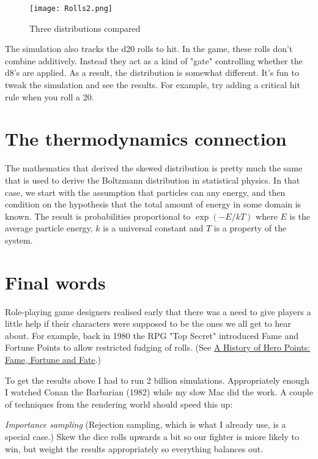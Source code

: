 \documentclass[12pt]{article}
\begin{document}
\begin{figure}
\begin{center}
\texttt{[image: Rolls2.png]}
\caption{Three distributions compared}
\label{rolls:2}
\end{center}
\end{figure}

The simulation also tracks the d20 rolls to hit.
In the game, these rolls don't combine additively.
Instead they act as a kind of "gate" controlling whether the d8's are applied.
As a result, the distribution is somewhat different.
It's fun to tweak the simulation and see the results.
For example, try adding a critical hit rule when you roll a 20.

\section{The thermodynamics connection}
The mathematics that derived the skewed distribution is pretty much the same that is used to derive the Boltzmann distribution in statistical physics.
In that case, we start with the assumption that particles can any energy, and then condition on the hypothesis that the total amount of energy in some domain is known.
The result is probabilities proportional to $\exp(-E/kT)$ where $E$ is the average particle energy, $k$ is a universal constant and $T$ is a property of the system.

\section{Final words}
Role-playing game designers realised early that there was a need to give players a little help if their characters were supposed to be the ones we all get to hear about.
For example, back in 1980 the RPG "Top Secret" introduced Fame and Fortune Points to allow restricted fudging of rolls.
(See \href{http://playingattheworld.blogspot.com/2021/01/a-history-of-hero-points-fame-fortune.html}{A History of Hero Points: Fame, Fortune and Fate}.)

To get the results above I had to run 2 billion simulations.
Appropriately enough I watched Conan the Barbarian (1982) while my slow Mac did the work.
A couple of techniques from the rendering world should speed this up:

\emph{Importance sampling} (Rejection sampling, which is what I already use, is a special case.) Skew the dice rolls upwards a bit so our fighter is miore likely to win, but weight the results appropriately so everything balances out.
\end{document}
